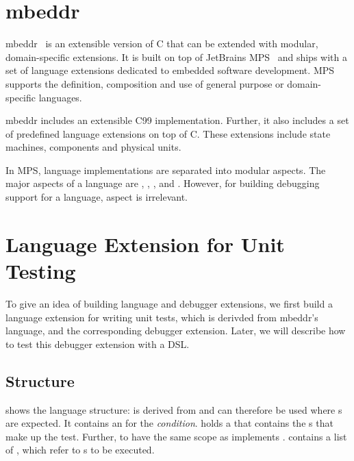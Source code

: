 \section{mbeddr}

mbeddr~\cite{Voelter:2012:MEC:2384716.2384767} is an extensible version of C
that can be extended with modular, domain-specific extensions. 
It is built on top of JetBrains \ac{MPS}~\cite{2012_mps_homepage}
and ships with a set of language extensions dedicated to embedded software
development. \ac{MPS} supports the definition, composition and use of general
purpose or domain-specific languages.

mbeddr includes an extensible C99 implementation. Further, 
it also includes a set of predefined language extensions on top of C. These 
extensions include state machines, components and physical units.

In \ac{MPS}, language implementations are separated into modular aspects. 
The major aspects  of a language are , 
, ,  and . However, for
building debugging support for a language,  aspect is irrelevant.

\section{Language Extension for Unit Testing}

To give an idea of building language and debugger extensions, we first 
build a language extension for writing 
unit tests, which is derivded from mbeddr's 
language, and the corresponding debugger extension. Later,
we will describe how to test this debugger extension with a \ac{DSL}. 

\subsection{Structure}

 shows the language structure:
 is derived from  and can therefore
be used where s are expected. It contains an 
for the \emph{condition}.
 holds a  that contains the s
that make up the test. Further, to have the same scope as 
 implements .
 contains a list of
, which refer to s to be executed.

